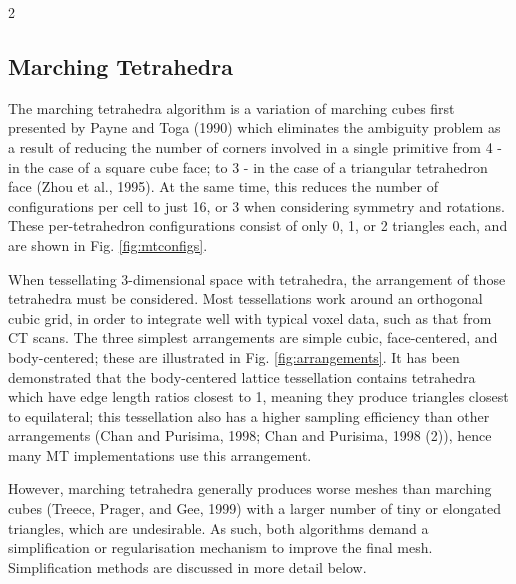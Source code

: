 \documentclass[]{article}
\newenvironment{singlecolfigure}
  {\par\medskip\noindent\minipage{\linewidth}}
  {\endminipage\par\medskip}
\begin{document}
\begin{multicols}{2}
\subsection{Marching Tetrahedra}\label{marching-tetrahedra}

The marching tetrahedra algorithm is a variation of marching cubes first presented by Payne and Toga (1990) which eliminates the ambiguity problem as a result of reducing the number of corners involved in a single primitive from 4 - in the case of a square cube face; to 3 - in the case of a triangular tetrahedron face (Zhou et al., 1995). At the same time, this reduces the number of configurations per cell to just 16, or 3 when considering symmetry and rotations. These per-tetrahedron configurations consist of only 0, 1, or 2 triangles each, and are shown in Fig. \ref{fig:mtconfigs}.

\begin{singlecolfigure}
    \centering
    
    \label{fig:mtconfigs}
\end{singlecolfigure}

\FloatBarrier

When tessellating 3-dimensional space with tetrahedra, the arrangement of those tetrahedra must be considered. Most tessellations work around an orthogonal cubic grid, in order to integrate well with typical voxel data, such as that from CT scans. The three simplest arrangements are simple cubic, face-centered, and body-centered; these are illustrated in Fig. \ref{fig:arrangements}. It has been demonstrated that the body-centered lattice tessellation contains tetrahedra which have edge length ratios closest to 1, meaning they produce triangles closest to equilateral; this tessellation also has a higher sampling efficiency than other arrangements (Chan and Purisima, 1998; Chan and Purisima, 1998 (2)), hence many MT implementations use this arrangement.

However, marching tetrahedra generally produces worse meshes than marching cubes (Treece, Prager, and Gee, 1999) with a larger number of tiny or elongated triangles, which are undesirable. As such, both algorithms demand a simplification or regularisation mechanism to improve the final mesh. Simplification methods are discussed in more detail below.

\end{multicols}
\end{document}
